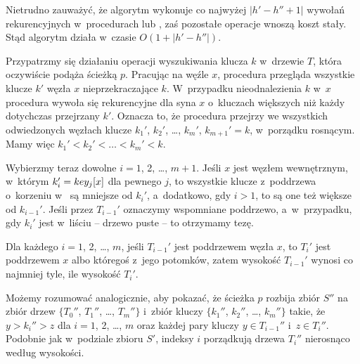 Nietrudno zauważyć, że algorytm wykonuje co najwyżej $|h'-h''+1|$ wywołań rekurencyjnych w~procedurach  lub , zaś pozostałe operacje wnoszą koszt stały.
Stąd algorytm działa w~czasie $O(1+|h'-h''|)$.

\subproblem %
Przypatrzmy się działaniu operacji wyszukiwania klucza $k$ w~drzewie $T$, która oczywiście podąża ścieżką $p$.
Pracując na węźle $x$, procedura przegląda wszystkie klucze $k'$ węzła $x$ nieprzekraczające $k$.
W~przypadku nieodnalezienia $k$ w~$x$ procedura wywoła się rekurencyjne dla syna $x$ o~kluczach większych niż każdy dotychczas przejrzany $k'$.
Oznacza to, że procedura przejrzy we wszystkich odwiedzonych węzłach klucze $k_1'$, $k_2'$, \dots, $k_m'$, $k_{m+1}'=k$, w~porządku rosnącym.
Mamy więc $k_1'<k_2'<\dots<k_m'<k$.

Wybierzmy teraz dowolne $i=1$, 2, \dots, $m+1$.
Jeśli $x$ jest węzłem wewnętrznym, w~którym $k_i'=\attribxx{x}{key_j}$ dla pewnego $j$, to wszystkie klucze z~poddrzewa o~korzeniu w~ są mniejsze od $k_i'$, a~dodatkowo, gdy $i>1$, to są one też większe od $k_{i-1}'$.
Jeśli przez $T_{i-1}'$ oznaczymy wspomniane poddrzewo, a~w~przypadku, gdy $k_i'$ jest w~liściu -- drzewo puste -- to otrzymamy tezę.

Dla każdego $i=1$, 2, \dots, $m$, jeśli $T_{i-1}'$ jest poddrzewem węzła $x$, to $T_i'$ jest poddrzewem $x$ albo któregoś z~jego potomków, zatem wysokość $T_{i-1}'$ wynosi co najmniej tyle, ile wysokość $T_i'$.

Możemy rozumować analogicznie, aby pokazać, że ścieżka $p$ rozbija zbiór $S''$ na zbiór drzew $\{T_0''$, $T_1''$, \dots, $T_m''\}$ i~zbiór kluczy $\{k_1''$, $k_2''$, \dots, $k_m''\}$ takie, że $y>k_i''>z$ dla $i=1$, 2, \dots, $m$ oraz każdej pary kluczy $y\in T_{i-1}''$ i~$z\in T_i''$.
Podobnie jak w~podziale zbioru $S'$, indeksy $i$ porządkują drzewa $T_i''$ nierosnąco według wysokości.

\subproblem %
